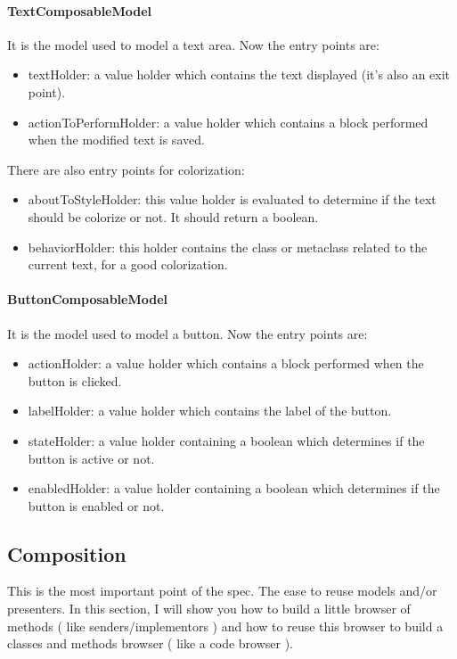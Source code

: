 \documentclass[a4paper,10pt,twoside]{book}
\begin{document}
\paragraph{TextComposableModel} It is the model used to model a text area.
Now the entry points are:
\begin{itemize}
	\item textHolder: a value holder which contains the text displayed (it's also an exit point).
	\item actionToPerformHolder: a value holder which contains a block performed when the modified text is saved.
\end{itemize}
There are also entry points for colorization:
\begin{itemize}	
	\item aboutToStyleHolder: this value holder is evaluated to determine if the text should be colorize or not. It should return a boolean.
	\item behaviorHolder: this holder contains the class or metaclass related to the current text, for a good colorization.
\end{itemize}

\paragraph{ButtonComposableModel} It is the model used to model a button.
Now the entry points are:
\begin{itemize}
	\item actionHolder: a value holder which contains a block performed when the button is clicked.
	\item labelHolder: a value holder which contains the label of the button.
	\item stateHolder: a value holder containing a boolean which determines if the button is active or not.
	\item enabledHolder: a value holder containing a boolean which determines if the button is enabled or not.
	\end{itemize}

\subsection{Composition}

This is the most important point of the spec. The ease to reuse models and/or presenters.
In this section, I will show you how to build a little browser of methods ( like senders/implementors ) and how to reuse this browser to build a classes and methods browser ( like a code browser ).
\end{document}

